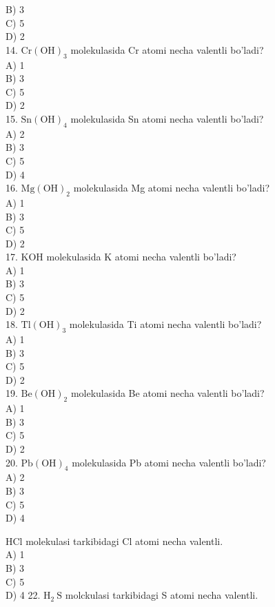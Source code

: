 B) 3\\
C) 5\\
D) 2\\
14. $\mathrm{Cr}(\mathrm{OH})_{3}$ molekulasida Cr atomi necha valentli bo'ladi?\\
A) 1\\
B) 3\\
C) 5\\
D) 2\\
15. $\mathrm{Sn}(\mathrm{OH})_{4}$ molekulasida Sn atomi necha valentli bo'ladi?\\
A) 2\\
B) 3\\
C) 5\\
D) 4\\
16. $\mathrm{Mg}(\mathrm{OH})_{2}$ molekulasida Mg atomi necha valentli bo'ladi?\\
A) 1\\
B) 3\\
C) 5\\
D) 2\\
17. KOH molekulasida K atomi necha valentli bo'ladi?\\
A) 1\\
B) 3\\
C) 5\\
D) 2\\
18. $\mathrm{Tl}(\mathrm{OH})_{3}$ molekulasida Ti atomi necha valentli bo'ladi?\\
A) 1\\
B) 3\\
C) 5\\
D) 2\\
19. $\mathrm{Be}(\mathrm{OH})_{2}$ molekulasida Be atomi necha valentli bo'ladi?\\
A) 1\\
B) 3\\
C) 5\\
D) 2\\
20. $\mathrm{Pb}(\mathrm{OH})_{4}$ molekulasida Pb atomi necha valentli bo'ladi?\\
A) 2\\
B) 3\\
C) 5\\
D) 4
  \item HCl molekulasi tarkibidagi Cl atomi necha valentli.\\
A) 1\\
B) 3\\
C) 5\\
D) 4
22. $\mathrm{H}_{2} \mathrm{~S}$ molckulasi tarkibidagi S atomi necha valentli.\\
